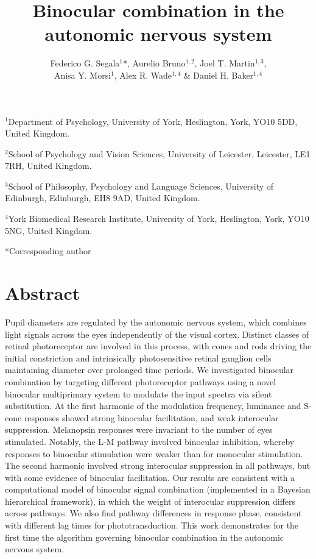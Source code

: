 \documentclass[
]{article}
\title{Binocular combination in the autonomic nervous system}
\author{Federico G. Segala\(^1\)*, Aurelio Bruno\(^{1,2}\), Joel T. Martin\(^{1,3}\),\\
Anisa Y. Morsi\(^1\), Alex R. Wade\(^{1,4}\) \& Daniel H. Baker\(^{1,4}\)}
\date{}
\begin{document}
\maketitle

\(^1\)Department of Psychology, University of York, Heslington, York, YO10 5DD, United Kingdom.

\(^2\)School of Psychology and Vision Sciences, University of Leicester, Leicester, LE1 7RH, United Kingdom.

\(^3\)School of Philosophy, Psychology and Language Sciences, University of Edinburgh, Edinburgh, EH8 9AD, United Kingdom.

\(^4\)York Biomedical Research Institute, University of York, Heslington, York, YO10 5NG, United Kingdom.

*Corresponding author

\section{Abstract}\label{abstract}

Pupil diameters are regulated by the autonomic nervous system, which combines light signals across the eyes independently of the visual cortex. Distinct classes of retinal photoreceptor are involved in this process, with cones and rods driving the initial constriction and intrinsically photosensitive retinal ganglion cells maintaining diameter over prolonged time periods. We investigated binocular combination by targeting different photoreceptor pathways using a novel binocular multiprimary system to modulate the input spectra via silent substitution. At the first harmonic of the modulation frequency, luminance and S-cone responses showed strong binocular facilitation, and weak interocular suppression. Melanopsin responses were invariant to the number of eyes stimulated. Notably, the L-M pathway involved binocular inhibition, whereby responses to binocular stimulation were weaker than for monocular stimulation. The second harmonic involved strong interocular suppression in all pathways, but with some evidence of binocular facilitation. Our results are consistent with a computational model of binocular signal combination (implemented in a Bayesian hierarchical framework), in which the weight of interocular suppression differs across pathways. We also find pathway differences in response phase, consistent with different lag times for phototransduction. This work demonstrates for the first time the algorithm governing binocular combination in the autonomic nervous system.
\end{document}
